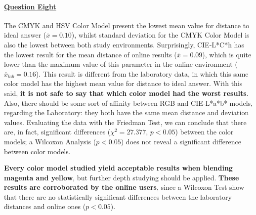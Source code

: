 \paragraph{\ul{Question Eight}}
%
The CMYK and HSV Color Model present the lowest mean value for distance to ideal answer ($\overline{x} = 0.10$), whilst standard deviation for the CMYK Color Model is also the lowest between both study environments.
Surprisingly, CIE-L*C*h has the lowest result for the mean distance of online results ($\overline{x} = 0.09$), which is quite lower than the maximum value of this parameter in the online
environment ($\overline{x}_{lab} = 0.16$). This result is different from the laboratory data, in which this same color model has the highest mean value for distance to ideal answer. With
this said, \textbf{it is not safe to say that which color model had the worst results}. Also, there should be some sort of affinity between RGB and CIE-L*a*b* models, regarding the Laboratory: they both have the same mean distance and deviation values.
Evaluating the data with the Friedman Test, we can conclude that there are, in fact, significant differences ($\chi^2 = 27.377$, $p < 0.05$) between the color models; a Wilcoxon Analysis
($p < 0.05$) does not reveal a significant difference between color models. \par
%
\textbf{Every color model studied yield acceptable results when blending magenta and yellow}, but further depth studying should be applied. \textbf{These results are corroborated by the online users}, since a Wilcoxon Test show that there are no
statistically significant differences between the laboratory distances and online ones ($p < 0.05$).
%
